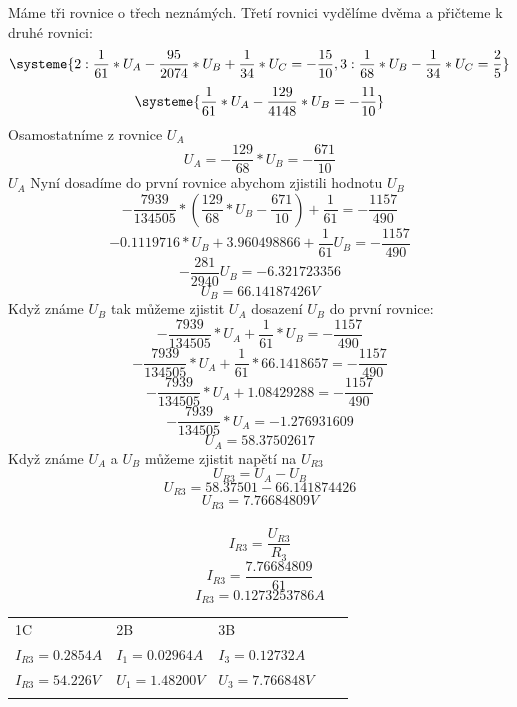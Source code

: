 \documentclass[11pt]{article}
\begin{document}
Máme tři rovnice o třech neznámých. Třetí rovnici vydělíme dvěma a přičteme k druhé rovnici:
\begin{equation*}
  \systeme{
  2: \frac{1}{61} *U_A - \frac{95}{2074}*U_B + \frac{1}{34}*U_C = -\frac{15}{10},
  3: \frac{1}{68} *U_B - \frac{1}{34}*U_C = \frac{2}{5}
  }
\end{equation*}
\begin{equation*}
  \systeme{
  \frac{1}{61}*U_A - \frac{129}{4148}*U_B = -\frac{11}{10}
  }
\end{equation*}
Osamostatníme z rovnice $U_A$
$$U_A = -\frac{129}{68}*U_B = -\frac{671}{10}$$
$U_A$ Nyní dosadíme do první rovnice abychom zjistili hodnotu $U_B$
$$-\frac{7939}{134505}*(\frac{129}{68}*U_B - \frac{671}{10}) + \frac{1}{61} = -\frac{1157}{490}$$
$$-0.1119716*U_B + 3.960498866 + \frac{1}{61}U_B = -\frac{1157}{490}$$
$$-\frac{281}{2940}U_B = -6.321723356$$
$$U_B = 66.14187426V$$
Když známe $U_B$ tak můžeme zjistit $U_A$ dosazení $U_B$ do první rovnice:
$$-\frac{7939}{134505}*U_A + \frac{1}{61}*U_B = -\frac{1157}{490}$$
$$-\frac{7939}{134505}*U_A + \frac{1}{61}*66.1418657 = -\frac{1157}{490}$$
$$-\frac{7939}{134505}*U_A + 1.08429288 = -\frac{1157}{490}$$
$$-\frac{7939}{134505}*U_A = -1.276931609$$
$$U_A = 58.37502617$$
Když známe $U_A$ a $U_B$ můžeme zjistit napětí na $U_{R3}$
$$U_{R3} = U_A - U_B$$
$$U_{R3} = 58.37501 - 66.141874426$$
$$U_{R3} = 7.76684809V$$\\
$$I_{R3} = \frac{U_{R3}}{R_3}$$
$$I_{R3} = \frac{7.76684809}{61}$$
$$I_{R3} = 0.1273253786A$$
\newpage
\begin{table}[]
\begin{tabular}{lllll}
1C                  & 2B & 3B &  &  \\
$I_{R3} = 0.2854A$  & $I_1 = 0.02964A$   & $I_3 = 0.12732A$   &  &  \\
$I_{R3} = 54.226V$  & $U_1 = 1.48200V$   & $U_3 = 7.766848V$   &  &  \\
                    &    &    &  & 
\end{tabular}
\end{table}
\end{document}
